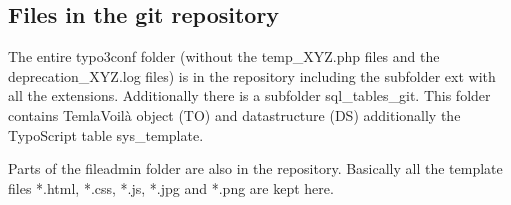 \subsection{Files in the git repository}
The entire typo3conf folder (without the temp\_XYZ.php files and the deprecation\_XYZ.log files) is in the repository including the subfolder ext with all the extensions. Additionally there is a subfolder sql\_tables\_git. This folder contains TemlaVoilà object (TO) and datastructure (DS) additionally the TypoScript table sys\_template.

Parts of the fileadmin folder are also in the repository. Basically all the template files *.html, *.css, *.js, *.jpg and *.png are kept here.
\nopagebreak[4]